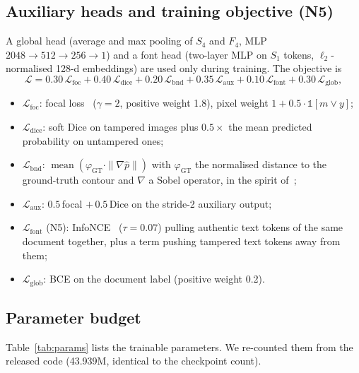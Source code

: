\documentclass[11pt,a4paper]{article}
\begin{document}
\subsection{Auxiliary heads and training objective (N5)}\label{sec:loss}
A global head (average and max pooling of $S_4$ and $F_4$, MLP $2048\to512\to256\to1$) and a
font head (two-layer MLP on $S_1$ tokens, $\ell_2$-normalised 128-d embeddings) are used only
during training. The objective is
\begin{equation}
\mathcal{L}=0.30\,\mathcal{L}_{\mathrm{foc}}+0.40\,\mathcal{L}_{\mathrm{dice}}+0.20\,\mathcal{L}_{\mathrm{bnd}}
+0.35\,\mathcal{L}_{\mathrm{aux}}+0.10\,\mathcal{L}_{\mathrm{font}}+0.30\,\mathcal{L}_{\mathrm{glob}},
\end{equation}
\begin{itemize}
  \item $\mathcal{L}_{\mathrm{foc}}$: focal loss~\cite{focal} ($\gamma=2$, positive weight 1.8),
        pixel weight $1+0.5\cdot\mathbb{1}[m\lor y]$;
  \item $\mathcal{L}_{\mathrm{dice}}$: soft Dice on tampered images plus $0.5\times$ the mean
        predicted probability on untampered ones;
  \item $\mathcal{L}_{\mathrm{bnd}}$: $\operatorname{mean}(\varphi_{\mathrm{GT}}\cdot\|\nabla\hat p\|)$
        with $\varphi_{\mathrm{GT}}$ the normalised distance to the ground-truth contour and
        $\nabla$ a Sobel operator, in the spirit of~\cite{boundary};
  \item $\mathcal{L}_{\mathrm{aux}}$: $0.5\,$focal $+\,0.5\,$Dice on the stride-2 auxiliary output;
  \item $\mathcal{L}_{\mathrm{font}}$ (N5): InfoNCE~\cite{infonce} ($\tau=0.07$) pulling authentic
        text tokens of the same document together, plus a term pushing tampered text tokens away
        from them;
  \item $\mathcal{L}_{\mathrm{glob}}$: BCE on the document label (positive weight 0.2).
\end{itemize}

\subsection{Parameter budget}
Table~\ref{tab:params} lists the trainable parameters. We re-counted them from the released code
(43.939M, identical to the checkpoint count).
\end{document}

